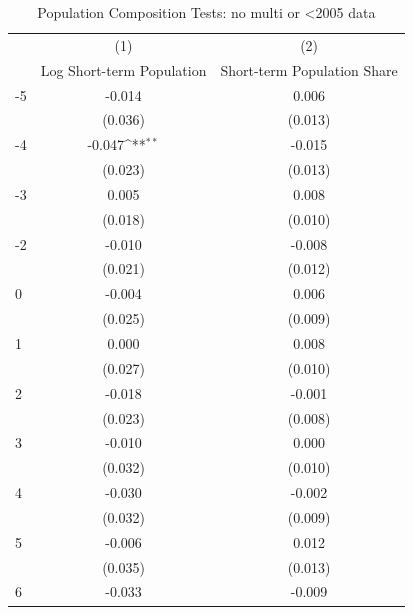 \begin{table}[htbp]\centering
\def\sym#1{\ifmmode^{#1}\else\(^{#1}\)\fi}
\caption{Population Composition Tests: no multi or <2005 data}
\begin{tabular}{l*{2}{c}}
\hline\hline
            &\multicolumn{1}{c}{(1)}&\multicolumn{1}{c}{(2)}\\
            &\multicolumn{1}{c}{Log Short-term Population}&\multicolumn{1}{c}{Short-term Population Share}\\
\hline
-5          &      -0.014         &       0.006         \\
            &     (0.036)         &     (0.013)         \\
[1em]
-4          &      -0.047\sym{**} &      -0.015         \\
            &     (0.023)         &     (0.013)         \\
[1em]
-3          &       0.005         &       0.008         \\
            &     (0.018)         &     (0.010)         \\
[1em]
-2          &      -0.010         &      -0.008         \\
            &     (0.021)         &     (0.012)         \\
[1em]
0           &      -0.004         &       0.006         \\
            &     (0.025)         &     (0.009)         \\
[1em]
1           &       0.000         &       0.008         \\
            &     (0.027)         &     (0.010)         \\
[1em]
2           &      -0.018         &      -0.001         \\
            &     (0.023)         &     (0.008)         \\
[1em]
3           &      -0.010         &       0.000         \\
            &     (0.032)         &     (0.010)         \\
[1em]
4           &      -0.030         &      -0.002         \\
            &     (0.032)         &     (0.009)         \\
[1em]
5           &      -0.006         &       0.012         \\
            &     (0.035)         &     (0.013)         \\
[1em]
6           &      -0.033         &      -0.009         \\

\end{tabular}
\end{table}
